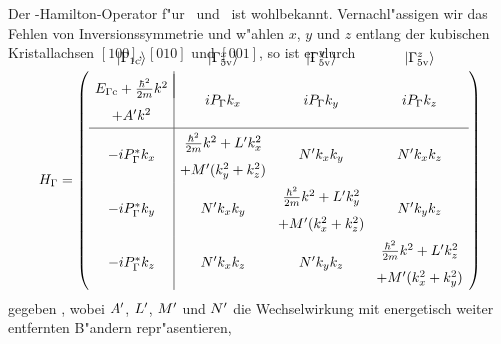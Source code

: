 Der \kdotp-Hamilton-Operator f"ur \GCB\ und \GVB\ ist wohlbekannt.
Vernachl"assigen wir das Fehlen von Inversionssymmetrie und w"ahlen $x$, $y$
und $z$ entlang der kubischen Kristallachsen $[100]$, $[010]$ und $[001]$, so
ist er durch 
%
\vspace*{4ex}
\begin{equation}
\renewcommand{\arraystretch}{1.6}
\setlength{\arraycolsep}{0.5ex}
\label{eq:k.p-G}
\op{H_{\Gamma}} = 
\left(
\begin{array}{c|ccc}
  \raisebox{2.0em}[0ex][0ex]{\ket{\GCB}} 
& \raisebox{2.0em}[0ex][0ex]{\ket{\GVBx}} 
& \raisebox{2.0em}[0ex][0ex]{\ket{\GVBy}} 
& \raisebox{2.0em}[0ex][0ex]{\ket{\GVBz}} \\[-4ex]
\begin{array}[c]{c}
 E_{\Gamma\text{c}} + \frac{\hbar^{2}}{2m} k^{2} \\ + \pri{A} k^{2}  
\end{array}
&  i\PG k_{x} 
&  i\PG k_{y} 
&  i\PG k_{z} \\
\hline
  -i\cc{\PG} k_{x} 
& \begin{array}[c]{c}
  \frac{\hbar^{2}}{2m} k^{2} + \pri{L} k_{x}^{2} \\ 
  + \pri{M} (k_{y}^{2}+k_{z}^{2})
\end{array}
& \pri{N} k_{x} k_{y} 
& \pri{N} k_{x} k_{z} \\
  -i\cc{\PG} k_{y} 
& \pri{N} k_{x} k_{y} 
& \begin{array}[c]{c}
  \frac{\hbar^{2}}{2m} k^{2} + \pri{L} k_{y}^{2} \\ 
  + \pri{M} (k_{x}^{2}+k_{z}^{2})
\end{array}
& \pri{N} k_{y} k_{z} \\
  -i\cc{\PG} k_{z} 
& \pri{N} k_{x} k_{z} 
& \pri{N} k_{y} k_{z} 
& \begin{array}[c]{c}
  \frac{\hbar^{2}}{2m} k^{2} + \pri{L} k_{z}^{2} \\ 
  + \pri{M} (k_{x}^{2}+k_{y}^{2})
\end{array} \\
\end{array}\right) 
\renewcommand{\arraystretch}{0.625}
\end{equation}
%
gegeben \cite{kane:66}, wobei $A^{\prime}$, $L^{\prime}$, $M^{\prime}$ und $N^{\prime}$
die Wechselwirkung mit energetisch weiter entfernten B"andern repr"asentieren,
